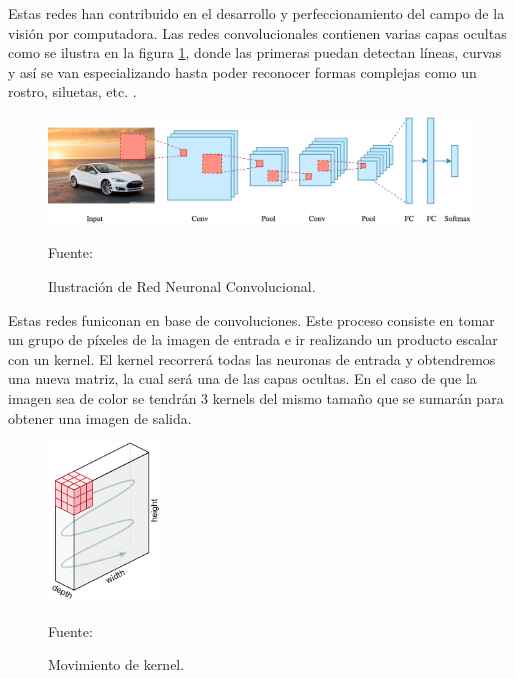 Estas redes han contribuido en el desarrollo y perfeccionamiento del campo de la visión por computadora. Las redes convolucionales contienen varias capas ocultas como se ilustra en la figura \ref{fig:red_neuronal_convolucional}, donde las primeras puedan detectan líneas, curvas y así se van especializando hasta poder reconocer formas complejas como un rostro, siluetas, etc. \cite{convolutional:ia}. \\

\begin{figure}[H]
    \begin{center}
        \includegraphics[width=12cm]{img/capitulo_2/convolucional.png}
    \end{center}
    \begin{center}
        \caption{Ilustración de Red Neuronal Convolucional.}
        Fuente: \cite{intro_redes_neuronales}
        \label{fig:red_neuronal_convolucional}
    \end{center}
\end{figure}

Estas redes funiconan en base de convoluciones. Este proceso consiste en tomar un grupo de píxeles de la imagen de entrada e ir realizando un producto escalar con un kernel. El kernel recorrerá todas las neuronas de entrada y obtendremos una nueva matriz, la cual será una de las capas ocultas. En el caso de que la imagen sea de color se tendrán 3 kernels del mismo tamaño que se sumarán para obtener una imagen de salida.\\

\begin{figure}[H]
    \begin{center}
        \includegraphics[width=3cm]{img/capitulo_2/kernel.png}
    \end{center}
    \begin{center}
        \caption{Movimiento de kernel.}
        Fuente: \cite{comprension_redes_neuronales}
        \label{fig:kernel}
    \end{center}
\end{figure}


